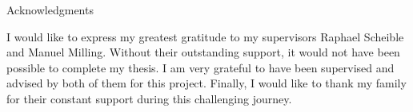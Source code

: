 \thispagestyle{empty}

\vspace*{20mm}

\begin{center}
{ Acknowledgments}
\end{center}

\vspace{10mm}

I would like to express my greatest gratitude to my supervisors Raphael Scheible
and Manuel Milling. Without their outstanding support, it would not have been
possible to complete my thesis. I am very grateful to have been supervised and
advised by both of them for this project. Finally, I would like to thank my
family for their constant support during this challenging journey.

\cleardoublepage{}

